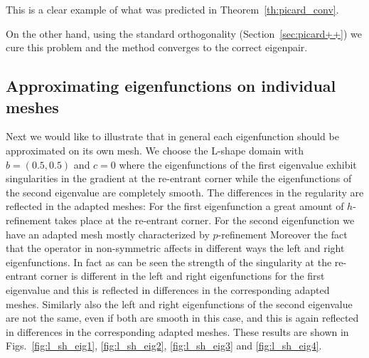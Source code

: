 \documentclass[smallextended]{svjour3}
\begin{document}
\vspace{4mm}
\noindent
This is a clear example of what was predicted in Theorem~\ref{th:picard_conv}.

On the other hand, using the standard orthogonality (Section~\ref{sec:picard++}) we cure this problem and the method 
converges to the correct eigenpair. 


\subsection{Approximating eigenfunctions on individual meshes}\label{ssec:n_adapt}

Next we would like to illustrate that in general each eigenfunction should be approximated on its own mesh.
We choose the L-shape domain with $b=(0.5,0.5)$ and $c=0$ where the eigenfunctions of the first eigenvalue exhibit  
singularities in the gradient at the re-entrant corner while the eigenfunctions of the second eigenvalue are completely smooth.
The differences in the regularity are reflected in the adapted meshes: 
For the first eigenfunction a great amount of $h$-refinement takes place at the re-entrant corner. 
For the second eigenfunction we have an adapted mesh mostly characterized by $p$-refinement
Moreover the fact that the operator in non-symmetric affects in different ways the left and right eigenfunctions. 
In fact as can be seen the strength of the singularity at the re-entrant corner is different in the left and right eigenfunctions for the first eigenvalue and this is reflected in differences in the corresponding adapted meshes.
Similarly also the left and right eigenfunctions of the second eigenvalue are not the same, even if both are smooth in this case, and this is again reflected in differences in the corresponding adapted meshes.
These results are shown in Figs.~\ref{fig:l_sh_eig1}, \ref{fig:l_sh_eig2}, \ref{fig:l_sh_eig3} and \ref{fig:l_sh_eig4}.
\end{document}
